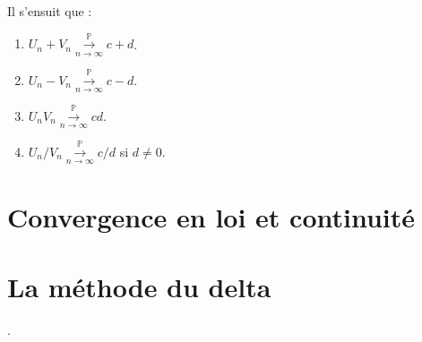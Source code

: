 \documentclass[10pt, french]{report}
\begin{document}
\begin{multicols*}{2}
\begin{definitionNOHFILL}[Proposition]
\bigskip

Il s'ensuit que : 
\begin{enumerate}
	\item	$U_{n} + V_{n} \overset{\mathbb{P}}{\underset{n \rightarrow \infty}{\longrightarrow}} c + d$.
	\item	$U_{n} - V_{n} \overset{\mathbb{P}}{\underset{n \rightarrow \infty}{\longrightarrow}} c - d$.
	\item	$U_{n} V_{n} \overset{\mathbb{P}}{\underset{n \rightarrow \infty}{\longrightarrow}} c d$.
	\item	$U_{n} / V_{n} \overset{\mathbb{P}}{\underset{n \rightarrow \infty}{\longrightarrow}} c / d$ si $d \neq 0$.
\end{enumerate}
\end{definitionNOHFILL}


\columnbreak
\section{Convergence en loi et continuité}


\columnbreak
\section{La méthode du delta}
.



\end{multicols*}
\end{document}
